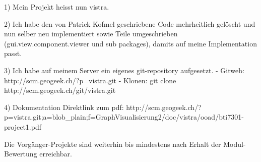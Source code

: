 1) Mein Projekt heisst nun vistra.

2) Ich habe den von Patrick Kofmel geschriebene Code
mehrheitlich gelöscht und nun selber neu implementiert
sowie Teile umgeschrieben (gui.view.component.viewer und sub packages), damits auf meine Implementation passt.

3) Ich habe auf meinem Server ein eigenes git-repository aufgesetzt.
- Gitweb:
http://scm.geogeek.ch/?p=vistra.git
- Klonen:
git clone http://scm.geogeek.ch/git/vistra.git

4) Dokumentation
Direktlink zum pdf:
http://scm.geogeek.ch/?p=vistra.git;a=blob_plain;f=GraphVisualisierung2/doc/vistra/ooad/bti7301-project1.pdf


Die Vorg\"anger-Projekte sind weiterhin bis mindestens nach Erhalt der Modul-Bewertung erreichbar.